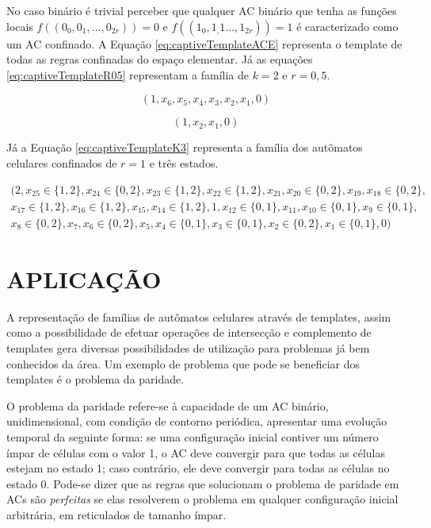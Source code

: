 \documentclass[12pt,a4paper]{article}
\let\stdsection\section
\renewcommand\section{\newpage\stdsection}
\begin{document}
	No caso binário é trivial perceber que qualquer AC binário que tenha as funções locais $f((0_0, 0_1,\dots, 0_{2r})) = 0$ e $f((1_0, 1_,1\dots, 1_{2r})) = 1$ é caracterizado como um AC confinado. A Equação \ref{eq:captiveTemplateACE} representa o template de todas as regras confinadas do espaço elementar. Já as equações \ref{eq:captiveTemplateR05} representam a família de $k=2$ e $r=0,5$.

	\begin{equation}
	(1,x_6,x_5,x_4,x_3,x_2,x_1,0)
	\label{eq:captiveTemplateACE}
	\end{equation}

	\begin{equation}
	(1,x_2,x_1,0)
	\label{eq:captiveTemplateR05}
	\end{equation}

	Já a Equação \ref{eq:captiveTemplateK3} representa a família dos autômatos celulares confinados de $r=1$ e três estados.

	\begin{equation}
	\begin{split}
	(2, x_{25} \in \{1,2\}, x_{24} \in \{0,2\}, x_{23} \in \{1,2\}, x_{22} \in \{1,2\}, x_{21}, x_{20} \in \{0,2\}, x_{19}, x_{18} \in \{0,2\}, \\
	x_{17} \in \{1,2\}, x_{16} \in \{1,2\}, x_{15}, x_{14} \in \{1,2\},1, x_{12} \in \{0,1\}, x_{11}, x_{10} \in \{0,1\}, x_9 \in \{0,1\}, \\
	x_8 \in \{0,2\}, x_7, x_6 \in \{0,2\}, x_5, x_4 \in \{0,1\}, x_3 \in \{0,1\}, x_2 \in \{0,2\}, x_1 \in \{0,1\}, 0)
	\label{eq:captiveTemplateK3}
	\end{split}
	\end{equation}









\section{APLICAÇÃO}\label{sec:aplicacao}
 A representação de famílias de autômatos celulares através de templates, assim como a possibilidade de efetuar operações de intersecção e complemento de templates gera diversas possibilidades de utilização para problemas já bem conhecidos da área. Um exemplo de problema que pode se beneficiar dos templates é o problema da paridade.

 O problema da paridade refere-se à capacidade de um AC binário, unidimensional, com condição de contorno periódica, apresentar uma evolução temporal da seguinte forma: se uma configuração inicial contiver um número ímpar de células com o valor 1, o AC deve convergir para que todas as células estejam no estado 1; caso contrário, ele deve convergir para todas as células no estado 0. Pode-se dizer que as regras que solucionam o problema de paridade em ACs são \textit{perfeitas} se elas resolverem o problema em qualquer configuração inicial arbitrária, em reticulados de tamanho ímpar. 
\end{document}
